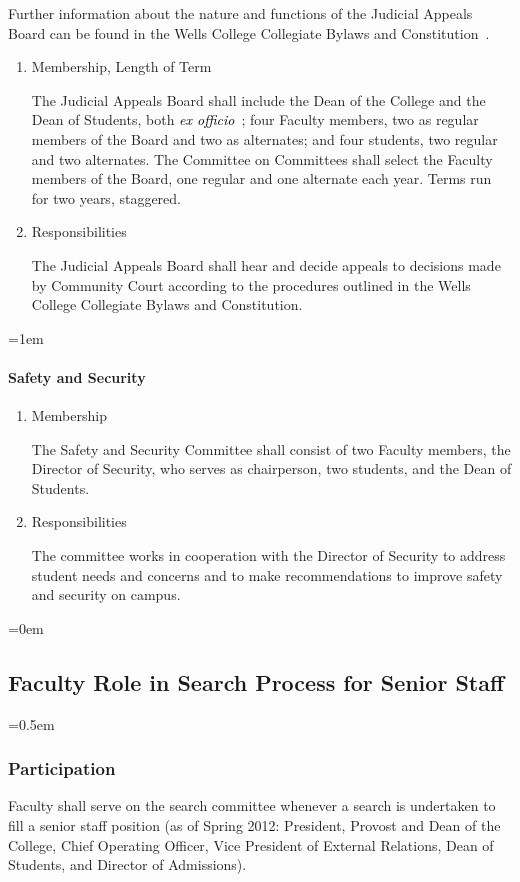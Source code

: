 \documentclass{manual}
\newcommand{\keyword}[1]{\textcolor{black}{#1}}
\newcommand{\constitution}{Wells College Collegiate Bylaws and Constitution~}
\newcommand{\exoff}{\keyword{\textit{ex officio}}~}
\let\oldsubsection\subsection
\renewcommand\subsection{\leftskip=0em\oldsubsection}
\let\oldsubsubsection\subsubsection
\renewcommand\subsubsection{\leftskip=0.5em\oldsubsubsection}
\let\oldparagraph\paragraph
\renewcommand\paragraph{\leftskip=1em\oldparagraph}
\newcommand{\itemLevelA}{\alph*.}
\newcommand{\itemRefA}{\alph*}
\begin{document}
Further information about the nature and functions of the Judicial Appeals Board can be found in the \constitution.
\begin{enumerate}[label=\itemLevelA,ref=\itemRefA]
\item Membership, Length of Term

The Judicial Appeals Board shall include the Dean of the College and the Dean of Students, both \exoff; four Faculty members, two as regular members of the Board and two as alternates; and four students, two regular and two alternates. The Committee on Committees shall select the Faculty members of the Board, one regular and one alternate each year. Terms run for two years, staggered.

\item Responsibilities

The Judicial Appeals Board shall hear and decide appeals to decisions made by Community Court according to the procedures outlined in the Wells College Collegiate Bylaws and Constitution.

\end{enumerate}

\paragraph{Safety and Security}
\begin{enumerate}[label=\itemLevelA,ref=\itemRefA]
\item Membership

The Safety and Security Committee shall consist of two Faculty members, the Director of Security, who serves as chairperson, two students, and the Dean of Students.

\item Responsibilities

The committee works in cooperation with the Director of Security to address student needs and concerns and to make recommendations to improve safety and security on campus.

\end{enumerate}

\subsection{Faculty Role in Search Process for Senior Staff}
\subsubsection{Participation}
Faculty shall serve on the search committee whenever a search is undertaken to fill a senior staff position (as of Spring 2012: President, Provost and Dean of the College, Chief Operating Officer, Vice President of External Relations, Dean of Students, and Director of Admissions).
\end{document}
